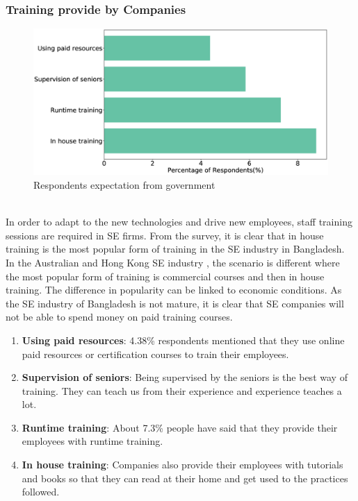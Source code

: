 \subsubsection{Training provide by Companies}
\label{Training provide by Companies}
\begin{figure}[htbp]
\includegraphics[scale=0.28]{Figures/Training.eps} 
\caption{Respondents expectation from government}
\label{fig:company training}
\end{figure}
\hfill\\
In order to adapt to the new technologies and drive new employees, staff training sessions are required in SE firms. From the survey, it is clear that in house training is the most popular form of training in the SE industry in Bangladesh. In the Australian \cite{Ng2004} and Hong Kong\cite{Chan2005} SE industry , the scenario is different where the most popular form of training is commercial courses and then in house training.  The difference in popularity can be linked to economic conditions. As the SE industry of Bangladesh is not mature, it is clear that SE companies will not be able to spend money on paid training courses.

\begin{enumerate}
    \item \textbf{Using paid resources}: 4.38\% respondents mentioned that they use online paid resources or certification courses to train their employees.
    
    \item\textbf{Supervision of seniors}: Being supervised by the seniors is the best way of training. They can teach us from their experience and experience teaches a lot.
    
    \item\textbf{Runtime training}: About 7.3\% people have said that they provide their employees with runtime training.
    
    \item\textbf{In house training}: Companies also provide their employees with tutorials and books so that they can read at their home and get used to the practices followed.
    
\end{enumerate}


